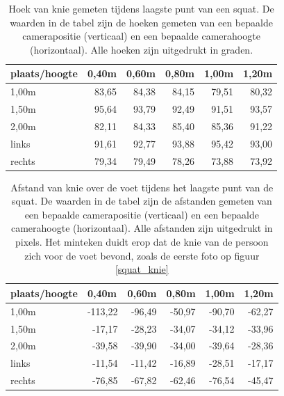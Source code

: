 \documentclass[a4paper,twoside,kulak]{kulakreport}
\begin{document}
\begin{table}[htbp]
	\centering
	\caption{Hoek van knie gemeten tijdens laagste punt van een squat. De waarden in de tabel zijn de hoeken gemeten van een bepaalde camerapositie (verticaal) en een bepaalde camerahoogte (horizontaal). Alle hoeken zijn uitgedrukt in graden.}
	\begin{tabular}{l|rrrrr} \toprule
		plaats/hoogte & 0,40m & 0,60m & 0,80m & 1,00m & 1,20m\\ \midrule
		1,00m & 83,65 & 84,38 & 84,15 & 79,51 & 80,32 \\
		1,50m & 95,64 & 93,79 & 92,49 & 91,51 & 93,57 \\
		2,00m & 82,11 & 84,33 & 85,40 & 85,36 & 91,22 \\
		links & 91,61 & 92,77 & 93,88 & 95,42 & 93,00 \\
		rechts & 79,34 & 79,49 & 78,26 & 73,88 & 73,92 \\
	\end{tabular}%
	\label{tabelhoek}%
\end{table}%
\begin{table}[htbp]
	\centering
	\caption{Afstand van knie over de voet tijdens het laagste punt van de squat. De waarden in de tabel zijn de afstanden gemeten van een bepaalde camerapositie (verticaal) en een bepaalde camerahoogte (horizontaal). Alle afstanden zijn uitgedrukt in pixels. Het minteken duidt erop dat de knie van de persoon zich voor de voet bevond, zoals de eerste foto op figuur \ref{squat_knie}}
	\begin{tabular}{l|rrrrr}
		plaats/hoogte & \multicolumn{1}{l}{0,40m} & \multicolumn{1}{l}{0,60m} & \multicolumn{1}{l}{0,80m} & \multicolumn{1}{l}{1,00m} & \multicolumn{1}{l}{1,20m} \\\midrule
		1,00m & -113,22 & -96,49 & -50,97 & -90,70 & -62,27 \\
		1,50m & -17,17 & -28,23 & -34,07 & -34,12 & -33,96 \\
		2,00m & -39,58 & -39,90 & -34,00 & -39,64 & -28,36 \\
		links & -11,54 & -11,42 & -16,89 & -28,51 & -17,17 \\
		rechts & -76,85 & -67,82 & -62,46 & -76,54 & -45,47 \\
	\end{tabular}%
	\label{tabelafstand}%
\end{table}%
\end{document}
